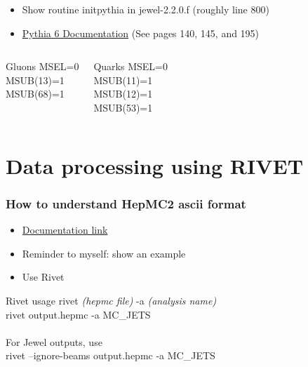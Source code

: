 \documentclass{beamer}
\begin{document}
\begin{frame}
 \begin{itemize}
  \item Show routine initpythia in jewel-2.2.0.f (roughly line 800)
  \item \href{https://pythia.org/download/pythia6/lutp0613man2.pdf}{Pythia 6 Documentation} (See pages 140, 145, and 195)
 \end{itemize}

 \begin{columns}

  \begin{exampleblock}{Gluons}
MSEL=0 \\
MSUB(13)=1\\
MSUB(68)=1\\
\phantom{Place holder MSUB}
  \end{exampleblock}

  \begin{block}{Quarks}
MSEL=0\\
MSUB(11)=1\\
MSUB(12)=1\\
MSUB(53)=1
  \end{block}


 \end{columns}


\end{frame}


\section{Data processing using RIVET}

\begin{frame}
 \frametitle{How to understand HepMC2 ascii format}
 \begin{itemize}
  \item \href{http://hepmc.web.cern.ch/hepmc/releases/HepMC2_user_manual.pdf}{Documentation link}
  \item Reminder to myself: show an example
  \item Use Rivet
 \end{itemize}

\begin{exampleblock}{Rivet usage}
	rivet \textit{(hepmc file)} -a \textit{(analysis name)}\\
	rivet output.hepmc -a MC\_JETS\\
	\phantom{Placeholder}\\
	For Jewel outputs, use\\
	rivet --ignore-beams output.hepmc -a MC\_JETS
\end{exampleblock}

\end{frame}  
\end{document}
